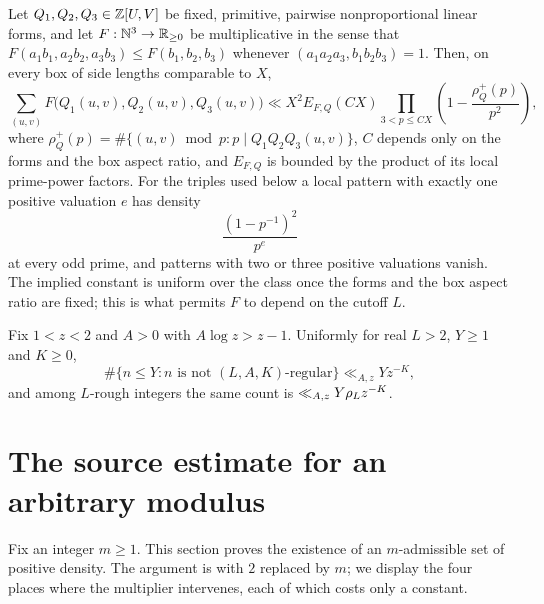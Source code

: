 \documentclass[11pt]{article}
\begin{document}
\begin{proposition}\label{prop:dBT}
Let \(Q_1,Q_2,Q_3\in\mathbb Z[U,V]\) be fixed, primitive, pairwise nonproportional
linear forms, and let \(F:\mathbb N^3\to\mathbb R_{\geq0}\) be multiplicative in the sense
that \(F(a_1b_1,a_2b_2,a_3b_3)\leq F(b_1,b_2,b_3)\) whenever
\((a_1a_2a_3,b_1b_2b_3)=1\). Then, on every box of side lengths comparable to
\(X\),
\begin{equation}\label{eq:dBT-shape}
 \sum_{(u,v)}F\bigl(Q_1(u,v),Q_2(u,v),Q_3(u,v)\bigr)
 \ll X^2E_{F,Q}(CX)\prod_{3<p\leq CX}\left(1-\frac{\rho_Q^+(p)}{p^2}\right),
\end{equation}
where \(\rho_Q^+(p)=\#\{(u,v)\bmod p:p\mid Q_1Q_2Q_3(u,v)\}\), \(C\) depends
only on the forms and the box aspect ratio, and \(E_{F,Q}\) is bounded by the
product of its local prime-power factors. For the triples used below a local
pattern with exactly one positive valuation \(e\) has density
\begin{equation}\label{eq:axis-density}
 \frac{(1-p^{-1})^2}{p^e}
\end{equation}
at every odd prime, and patterns with two or three positive valuations
vanish. The implied constant is uniform over the class once the forms and
the box aspect ratio are fixed; this is what permits \(F\) to depend on the
cutoff \(L\).
\end{proposition}

\begin{lemma}\label{lem:centered-tail}
Fix \(1<z<2\) and \(A>0\) with \(A\log z>z-1\). Uniformly for real \(L>2\),
\(Y\geq1\) and \(K\geq0\),
\[
 \#\{n\leq Y:n\text{ is not }(L,A,K)\text{-regular}\}\ll_{A,z}Yz^{-K},
\]
and among \(L\)-rough integers the same count is
\(\ll_{A,z}Y\rho_L z^{-K}\).
\end{lemma}

\section{The source estimate for an arbitrary modulus}\label{sec:source}

Fix an integer \(m\geq1\). This section proves the existence of an
\(m\)-admissible set of positive density. The argument is
\cite[\S4]{DellaPietra2026} with \(2\) replaced by \(m\); we display the four
places where the multiplier intervenes, each of which costs only a constant.
\end{document}
